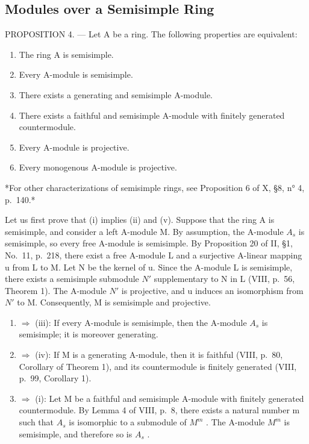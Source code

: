 \subsection{Modules over a Semisimple Ring}

PROPOSITION 4. --- Let A be a ring. The following properties are equivalent:

\begin{enumerate}
\def\labelenumi{(\roman{enumi})}
\item
  The ring A is semisimple.
\item
  Every A-module is semisimple.
\item
  There exists a generating and semisimple A-module.
\item
  There exists a faithful and semisimple A-module with finitely generated countermodule.
\item
  Every A-module is projective.
\item
  Every monogenous A-module is projective.
\end{enumerate}

*For other characterizations of semisimple rings, see Proposition 6 of X, §8, n° 4, p.~140.*

Let us first prove that (i) implies (ii) and (v). Suppose that the ring A is semisimple, and consider a left A-module M. By assumption, the A-module \(A_{s}\) is semisimple, so every free A-module is semisimple. By Proposition 20 of II, §1, No.~11, p.~218, there exist a free A-module L and a surjective A-linear mapping u from L to M. Let N be the kernel of u. Since the A-module L is semisimple, there exists a semisimple submodule \(N'\) supplementary to N in L (VIII, p.~56, Theorem 1). The A-module \(N'\) is projective, and u induces an isomorphism from \(N'\) to M. Consequently, M is semisimple and projective.

\begin{enumerate}
\def\labelenumi{(\roman{enumi})}
\setcounter{enumi}{1}
\item
  \(\Rightarrow\) (iii): If every A-module is semisimple, then the A-module \(A_{s}\) is semisimple; it is moreover generating.
\item
  \(\Rightarrow\) (iv): If M is a generating A-module, then it is faithful (VIII, p.~80, Corollary of Theorem 1), and its countermodule is finitely generated (VIII, p.~99, Corollary 1).
\item
  \(\Rightarrow\) (i): Let M be a faithful and semisimple A-module with finitely generated countermodule. By Lemma 4 of VIII, p.~8, there exists a natural number m such that \(A_{s}\) is isomorphic to a submodule of \(M^{m}\) . The A-module \(M^{m}\) is semisimple, and therefore so is \(A_{s}\) .
\end{enumerate}

